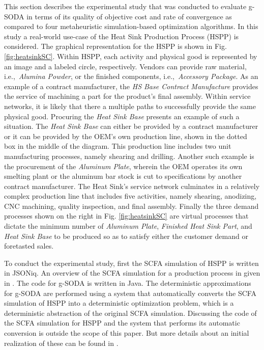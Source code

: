 \documentclass[a4paper, 12pt]{article} %
\begin{document}
This section describes the experimental study that was conducted to evaluate g-SODA in terms of its quality of objective cost and rate of convergence as compared to four metaheuristic simulation-based optimization algorithms. 
In this study a real-world use-case of the Heat Sink Production Process (HSPP) is considered.
The graphical representation for the HSPP  is shown in Fig. \ref{fig:heatsinkSC}.
Within HSPP, each activity and physical good is represented by an image and a labeled circle, respectively.  Vendors can provide raw material, i.e.,\ \textit{Alumina Powder}, or the finished components, i.e.,\ \textit{Accessory Package}.  As an example of a contract manufacturer, the \textit{HS Base Contract Manufacture} provides the service of machining a part for the product's final assembly.  Within service networks, it is likely that there a multiple paths to successfully provide the same physical good. Procuring the \textit{Heat Sink Base} presents an example of such a situation.  The \textit{Heat Sink Base} can either be provided by a contract manufacturer or it can be provided by the OEM's own production line, shown in the dotted box in the middle of the diagram.  This production line includes two unit manufacturing processes, namely shearing and drilling.  Another such example is the procurement of the \textit{Aluminum Plate}, wherein the OEM operates its own smelting plant or the aluminum bar stock is cut to specifications by another contract manufacturer. The Heat Sink's service network culminates in a relatively complex production line that includes five activities, namely shearing, anodizing, CNC machining, quality inspection, and final assembly. 
Finally the three demand processes shown on the right in Fig. \ref{fig:heatsinkSC} are virtual processes that dictate the minimum number of \textit{Aluminum Plate}, \textit{Finished Heat Sink Part}, and \textit{Heat Sink Base} to be produced so as to satisfy either the customer demand or foretasted sales. 

To conduct the experimental study, first the SCFA simulation of HSPP is written in JSONiq. An overview of the SCFA simulation for a production process in given in \cite{GMU-CS-TR-2017-3}.  The code for g-SODA is written in Java. The deterministic approximations for g-SODA are performed using a system that automatically converts the SCFA simulation of HSPP into a deterministic optimization problem, which is a deterministic abstraction of the original SCFA simulation. Discussing the code of the SCFA simulation for HSPP and the system that performs its automatic conversion is outside the scope of this paper. But more details about an initial realization of these can be found in \cite{Brodsky2016ieeebd,Brodsky2017ieeebd}.
\end{document}

